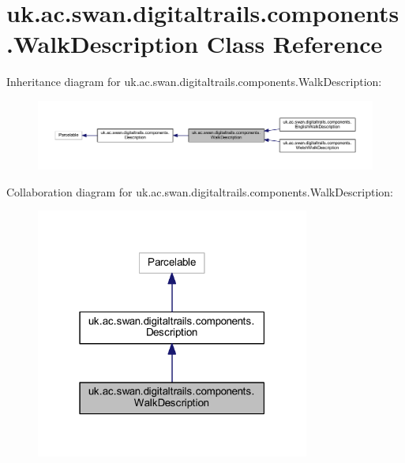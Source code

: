 \hypertarget{classuk_1_1ac_1_1swan_1_1digitaltrails_1_1components_1_1_walk_description}{\section{uk.\+ac.\+swan.\+digitaltrails.\+components.\+Walk\+Description Class Reference}
\label{classuk_1_1ac_1_1swan_1_1digitaltrails_1_1components_1_1_walk_description}
}


Inheritance diagram for uk.\+ac.\+swan.\+digitaltrails.\+components.\+Walk\+Description\+:\nopagebreak
\begin{figure}[H]
\begin{center}
\leavevmode
\includegraphics[width=350pt]{classuk_1_1ac_1_1swan_1_1digitaltrails_1_1components_1_1_walk_description__inherit__graph}
\end{center}
\end{figure}


Collaboration diagram for uk.\+ac.\+swan.\+digitaltrails.\+components.\+Walk\+Description\+:\nopagebreak
\begin{figure}[H]
\begin{center}
\leavevmode
\includegraphics[width=255pt]{classuk_1_1ac_1_1swan_1_1digitaltrails_1_1components_1_1_walk_description__coll__graph}
\end{center}
\end{figure}
